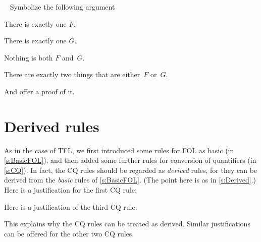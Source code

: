 \
\problempart
Symbolize the following argument
	\begin{earg}
		\item There is exactly one $F$. 
		\item There is exactly one $G$. 
		\item Nothing is both $F$ and~$G$. 
		\item[\texttherefore] There are exactly two things that are either~$F$ or~$G$.
	\end{earg}
And offer a proof of it.




\chapter{Derived rules}\label{s:DerivedFOL}
As in the case of TFL, we first introduced some rules for FOL as basic (in \cref{s:BasicFOL}), and then added some further rules for conversion of quantifiers (in \cref{s:CQ}). In fact, the CQ rules should be regarded as \emph{derived} rules, for they can be derived from the  \emph{basic} rules of \cref{s:BasicFOL}. (The point here is as in \cref{s:Derived}.) Here is a justification for the first CQ rule:
\begin{fitchproof}
	\open
		\AS
		\open
			\AS
		\close
	\close
\end{fitchproof}
Here is a justification of the third CQ rule:
\begin{fitchproof}
	\open
		\AS
		\open
			\AS
		\close
	\close
\end{fitchproof}
This explains why the CQ rules can be treated as derived. Similar justifications can be offered for the other two CQ rules.


